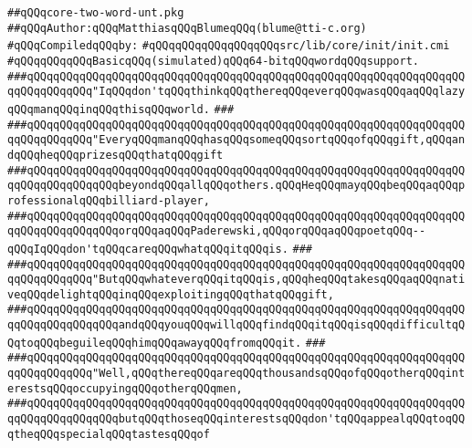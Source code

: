 \label{src/lib/core/init/core-two-word-unt.pkg}
\verb|##qQQqcore-two-word-unt.pkg|\newline
\verb|##qQQqAuthor:qQQqMatthiasqQQqBlumeqQQq(blume@tti-c.org)|\newline
\newline
\verb|#qQQqCompiledqQQqby:|\newline
\verb|#qQQqqQQqqQQqqQQqqQQqsrc/lib/core/init/init.cmi|\newline
\newline
\verb|#qQQqqQQqqQQqBasicqQQq(simulated)qQQq64-bitqQQqwordqQQqsupport.|\newline
\newline
\newline
\newline
\verb|###qQQqqQQqqQQqqQQqqQQqqQQqqQQqqQQqqQQqqQQqqQQqqQQqqQQqqQQqqQQqqQQqqQQqqQQqqQQqqQQq"IqQQqdon'tqQQqthinkqQQqthereqQQqeverqQQqwasqQQqaqQQqlazyqQQqmanqQQqinqQQqthisqQQqworld.|\newline
\verb|###|\newline
\verb|###qQQqqQQqqQQqqQQqqQQqqQQqqQQqqQQqqQQqqQQqqQQqqQQqqQQqqQQqqQQqqQQqqQQqqQQqqQQqqQQq"EveryqQQqmanqQQqhasqQQqsomeqQQqsortqQQqofqQQqgift,qQQqandqQQqheqQQqprizesqQQqthatqQQqgift|\newline
\verb|###qQQqqQQqqQQqqQQqqQQqqQQqqQQqqQQqqQQqqQQqqQQqqQQqqQQqqQQqqQQqqQQqqQQqqQQqqQQqqQQqqQQqbeyondqQQqallqQQqothers.qQQqHeqQQqmayqQQqbeqQQqaqQQqprofessionalqQQqbilliard-player,|\newline
\verb|###qQQqqQQqqQQqqQQqqQQqqQQqqQQqqQQqqQQqqQQqqQQqqQQqqQQqqQQqqQQqqQQqqQQqqQQqqQQqqQQqqQQqorqQQqaqQQqPaderewski,qQQqorqQQqaqQQqpoetqQQq--qQQqIqQQqdon'tqQQqcareqQQqwhatqQQqitqQQqis.|\newline
\verb|###|\newline
\verb|###qQQqqQQqqQQqqQQqqQQqqQQqqQQqqQQqqQQqqQQqqQQqqQQqqQQqqQQqqQQqqQQqqQQqqQQqqQQqqQQq"ButqQQqwhateverqQQqitqQQqis,qQQqheqQQqtakesqQQqaqQQqnativeqQQqdelightqQQqinqQQqexploitingqQQqthatqQQqgift,|\newline
\verb|###qQQqqQQqqQQqqQQqqQQqqQQqqQQqqQQqqQQqqQQqqQQqqQQqqQQqqQQqqQQqqQQqqQQqqQQqqQQqqQQqqQQqandqQQqyouqQQqwillqQQqfindqQQqitqQQqisqQQqdifficultqQQqtoqQQqbeguileqQQqhimqQQqawayqQQqfromqQQqit.|\newline
\verb|###|\newline
\verb|###qQQqqQQqqQQqqQQqqQQqqQQqqQQqqQQqqQQqqQQqqQQqqQQqqQQqqQQqqQQqqQQqqQQqqQQqqQQqqQQq"Well,qQQqthereqQQqareqQQqthousandsqQQqofqQQqotherqQQqinterestsqQQqoccupyingqQQqotherqQQqmen,|\newline
\verb|###qQQqqQQqqQQqqQQqqQQqqQQqqQQqqQQqqQQqqQQqqQQqqQQqqQQqqQQqqQQqqQQqqQQqqQQqqQQqqQQqqQQqbutqQQqthoseqQQqinterestsqQQqdon'tqQQqappealqQQqtoqQQqtheqQQqspecialqQQqtastesqQQqof|\newline

